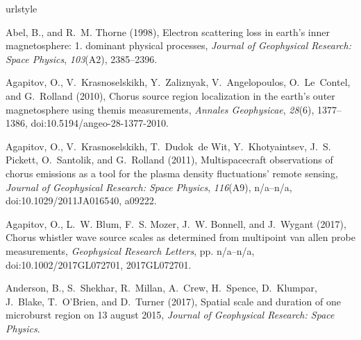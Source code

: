 \documentclass[draft, linenumbers]{agujournal}
\begin{document}
\begin{thebibliography}{35}
\providecommand{\natexlab}[1]{#1}
\expandafter\ifx\csname urlstyle\endcsname\relax
  \providecommand{\doi}[1]{doi:\discretionary{}{}{}#1}\else
  \providecommand{\doi}{doi:\discretionary{}{}{}\begingroup
  \urlstyle{rm}\Url}\fi
  
Abel, B., and R.~M. Thorne (1998), Electron scattering loss in earth's inner
  magnetosphere: 1. dominant physical processes, \textit{Journal of Geophysical
  Research: Space Physics}, \textit{103}(A2), 2385--2396.

Agapitov, O., V.~Krasnoselskikh, Y.~Zaliznyak, V.~Angelopoulos, O.~Le~Contel,
  and G.~Rolland (2010), Chorus source region localization in the earth's outer
  magnetosphere using themis measurements, \textit{Annales Geophysicae},
  \textit{28}(6), 1377--1386, \doi{10.5194/angeo-28-1377-2010}.

Agapitov, O., V.~Krasnoselskikh, T.~Dudok~de Wit, Y.~Khotyaintsev, J.~S.
  Pickett, O.~Santolik, and G.~Rolland (2011), Multispacecraft observations of
  chorus emissions as a tool for the plasma density fluctuations' remote
  sensing, \textit{Journal of Geophysical Research: Space Physics},
  \textit{116}(A9), n/a--n/a, \doi{10.1029/2011JA016540}, a09222.

Agapitov, O., L.~W. Blum, F.~S. Mozer, J.~W. Bonnell, and J.~Wygant (2017),
  Chorus whistler wave source scales as determined from multipoint van allen
  probe measurements, \textit{Geophysical Research Letters}, pp. n/a--n/a,
  \doi{10.1002/2017GL072701}, 2017GL072701.

Anderson, B., S.~Shekhar, R.~Millan, A.~Crew, H.~Spence, D.~Klumpar, J.~Blake,
  T.~O'Brien, and D.~Turner (2017), Spatial scale and duration of one
  microburst region on 13 august 2015, \textit{Journal of Geophysical Research:
  Space Physics}.


\end{thebibliography}
\end{document}
